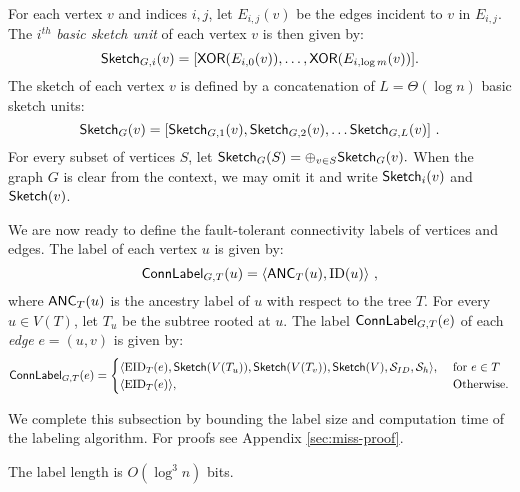 For each vertex $v$ and indices $i,j$, let $E_{i,j}(v)$ be the edges incident to $v$ in $E_{i,j}$. 
The $i^{th}$ \emph{basic sketch unit} of each vertex $v$ is then given by:
\begin{equation}
\label{eq:vsketch}
\mathsf{Sketch}_{G,i}(v)=[\mathsf{XOR}(E_{i,0}(v)),\ldots,\mathsf{XOR}(E_{i,\log m}(v))].
\end{equation}
The sketch of each vertex $v$ is defined by a concatenation of $L=\Theta(\log n)$ basic sketch units: 
$$\mathsf{Sketch}_G(v)=[\mathsf{Sketch}_{G,1}(v),\mathsf{Sketch}_{G,2}(v), \ldots\mathsf{Sketch}_{G,L}(v)]~.$$ 
For every subset of vertices $S$, let 
$\mathsf{Sketch}_G(S)=\oplus_{v \in S}\mathsf{Sketch}_G(v).$ When the graph $G$ is clear from the context, we may omit it and write $\mathsf{Sketch}_{i}(v)$ and $\mathsf{Sketch}(v)$. 

We are now ready to define the fault-tolerant connectivity labels of vertices and edges. 
The label of each vertex $u$ is given by:
\begin{equation}\label{eq:conn-vertex}
\mathsf{ConnLabel}_{G,T}(u)=\langle \mathsf{ANC}_T(u), \operatorname{ID}(u) \rangle~,
\end{equation}
where $\mathsf{ANC}_T(u)$ is the ancestry label of $u$ with respect to the tree $T$. 
For every $u \in V(T)$, let $T_u$ be the subtree rooted at $u$.  The label $\mathsf{ConnLabel}_{G,T}(e)$ of each \emph{edge} $e=(u,v)$ is given by:
\begin{equation*}
    \mathsf{ConnLabel}_{G,T}(e)=
    \begin{cases}
      \langle \operatorname{EID}_T(e), \mathsf{Sketch}(V(T_u)), \mathsf{Sketch}(V(T_v)), \mathsf{Sketch}(V), \mathcal{S}_{ID}, \mathcal{S}_h\rangle ,& \mbox{~for~} e \in T \\
     \langle \operatorname{EID}_T(e) \rangle,& \mbox{~Otherwise}.
    \end{cases}
\end{equation*}

We complete this subsection by bounding the label size and computation time of the labeling algorithm. For proofs see Appendix \ref{sec:miss-proof}. 
\begin{claim}\label{cl:label-length}
The label length is $O(\log^3 n)$ bits.
\end{claim}
\def\APPENDLABELCONSISE{
\begin{proof}[Proof of Claim \ref{cl:label-length}]
The label size is dominated by the sketching information $\Sketch(V(T_u))$, which is made of a concatenation of the bitwise XOR of $O(\log n)$ basic sketch units $\Sketch_i(u)$. By Eq. (\ref{eq:vsketch}), each unit has $O(\log^2 n)$ bits, and thus overall, the label has $O(\log^3 n)$ bits.
\end{proof}
}%

